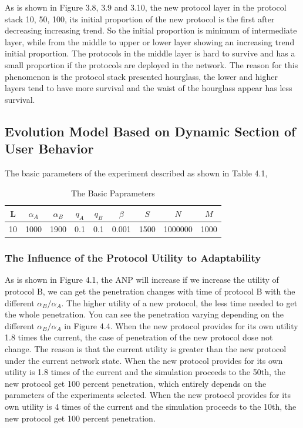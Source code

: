 \documentclass{article}
\begin{document}
As is shown in Figure 3.8, 3.9 and 3.10, the new protocol layer in the protocol stack 10, 50, 100, its initial proportion
of the new protocol is the first after decreasing increasing trend. So the initial proportion is minimum of intermediate
layer, while from the middle to upper or lower layer showing an increasing trend initial proportion. The protocols in the
middle layer is hard to survive and has a small proportion if the protocols are deployed in the network. The reason for
this phenomenon is the protocol stack presented hourglass, the lower and higher layers tend to have more survival and the
waist of the hourglass appear has less survival.

\subsection{Evolution Model Based on Dynamic Section of User Behavior}
The basic parameters of the experiment described as shown in Table 4.1,
\renewcommand\arraystretch{1.2}
\begin{table}%
  \centering
  \caption{The Basic Paprameters}\label{tab:tab1}
  \begin{tabular}{ccccccccc}
  \hline
  L & $\alpha_A$ & $\alpha_B$ & $q_A$ & $q_B$ &$\beta$ & $S$ & $N$ & $M$ \\
  \hline
  10 & 1000 & 1900 & 0.1 & 0.1 & 0.001 & 1500 & 1000000 & 1000 \\
  \hline
\end{tabular}

\end{table}

\subsubsection{The Influence of the Protocol Utility to Adaptability}
As is shown in Figure 4.1, the ANP will increase if we increase the utility of protocol B, we can get the penetration
changes with time of protocol B with the different $\alpha_{B}/\alpha_{A}$. The higher utility of a new protocol, the
less time needed to get the whole penetration. You can see the penetration varying depending on the different
$\alpha_{B}/\alpha_{A}$ in Figure 4.4. When the new protocol provides for its own utility 1.8 times the current, the
case of penetration of the new protocol dose not change. The reason is that the current utility is greater than the
new protocol under the current network state. When the new protocol provides for its own utility is 1.8 times of the
current and the simulation proceeds to the 50th,  the new protocol get 100 percent penetration, which entirely depends
on the parameters of the experiments selected. When the new protocol provides for its own utility is 4 times of the
current and the simulation proceeds to the 10th, the new protocol get 100 percent penetration.
\end{document}
